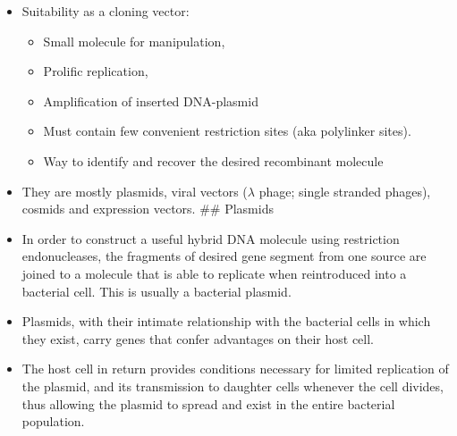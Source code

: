 \documentclass[11pt,dvipsnames,ignorenonframetext,aspectratio=169]{beamer}
\providecommand{\tightlist}{%
  \setlength{\itemsep}{0pt}\setlength{\parskip}{0pt}}
\begin{document}
\begin{frame}{}
\protect\hypertarget{section-16}{}
\begin{itemize}
\item
  Suitability as a cloning vector:

  \begin{itemize}
  \tightlist
  \item
    Small molecule for manipulation,
  \item
    Prolific replication,
  \item
    Amplification of inserted DNA-plasmid
  \item
    Must contain few convenient restriction sites (aka polylinker
    sites).
  \item
    Way to identify and recover the desired recombinant molecule
  \end{itemize}
\item
  They are mostly plasmids, viral vectors (\(\lambda\) phage; single
  stranded phages), cosmids and expression vectors. \#\# Plasmids
\item
  In order to construct a useful hybrid DNA molecule using restriction
  endonucleases, the fragments of desired gene segment from one source
  are joined to a molecule that is able to replicate when reintroduced
  into a bacterial cell. This is usually a bacterial plasmid.
\item
  Plasmids, with their intimate relationship with the bacterial cells in
  which they exist, carry genes that confer advantages on their host
  cell.
\item
  The host cell in return provides conditions necessary for limited
  replication of the plasmid, and its transmission to daughter cells
  whenever the cell divides, thus allowing the plasmid to spread and
  exist in the entire bacterial population.
\end{itemize}
\end{frame}
\end{document}
